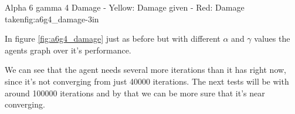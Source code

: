 			{Alpha 6 gamma 4 Damage - Yellow: Damage given - Red: Damage taken}{fig:a6g4_damage}{-3in}

In figure \ref{fig:a6g4_damage} just as before but with different $\alpha$ and $\gamma$ values the agents graph over it's performance.










We can see that the agent needs several more iterations than it has right now, since it's not converging from just 40000 iterations. The next tests will be with around 100000 iterations and by that we can be more sure that it's near converging.